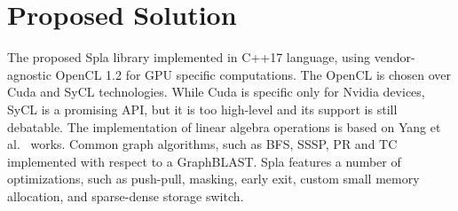 \section{Proposed Solution}

The proposed Spla library implemented in C++17 language, using vendor-agnostic OpenCL 1.2 for GPU specific computations. The OpenCL is chosen over Cuda and SyCL technologies. While Cuda is specific only for Nvidia devices, SyCL is a promising API, but it is too high-level and its support is still debatable. The implementation of linear algebra operations is based on Yang et al.~\cite{7284398:spvspm, https://doi.org/10.48550/arxiv.1804.03327:pushpull, yang2019graphblast} works. Common graph algorithms, such as BFS, SSSP, PR and TC implemented with respect to a GraphBLAST. Spla features a number of optimizations, such as push-pull, masking, early exit, custom small memory allocation, and sparse-dense storage switch.